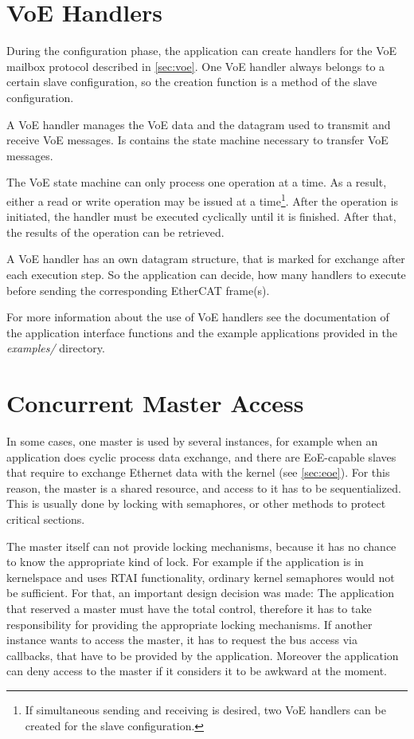 \documentclass[a4paper,12pt,BCOR=6mm,bibtotoc,idxtotoc]{scrbook}
\begin{document}
\section{VoE Handlers}
\label{sec:api-voe}

During the configuration phase, the application can create handlers for the
VoE mailbox protocol described in \autoref{sec:voe}. One VoE handler always
belongs to a certain slave configuration, so the creation function is a method
of the slave configuration.

A VoE handler manages the VoE data and the datagram used to transmit and
receive VoE messages. Is contains the state machine necessary to transfer VoE
messages.

The VoE state machine can only process one operation at a time. As a result,
either a read or write operation may be issued at a time\footnote{If
simultaneous sending and receiving is desired, two VoE handlers can be created
for the slave configuration.}. After the operation is initiated, the handler
must be executed cyclically until it is finished. After that, the results of
the operation can be retrieved.

A VoE handler has an own datagram structure, that is marked for exchange after
each execution step. So the application can decide, how many handlers to
execute before sending the corresponding EtherCAT frame(s).

For more information about the use of VoE handlers see the documentation of
the application interface functions and the example applications provided in
the \textit{examples/} directory.


\section{Concurrent Master Access}
\label{sec:concurr}

In some cases, one master is used by several instances, for example when an
application does cyclic process data exchange, and there are EoE-capable
slaves that require to exchange Ethernet data with the kernel (see
\autoref{sec:eoe}). For this reason, the master is a shared resource, and
access to it has to be sequentialized. This is usually done by locking with
semaphores, or other methods to protect critical sections.

The master itself can not provide locking mechanisms, because it has no chance
to know the appropriate kind of lock. For example if the application is in
kernelspace and uses RTAI functionality, ordinary kernel semaphores would not
be sufficient. For that, an important design decision was made: The
application that reserved a master must have the total control, therefore it
has to take responsibility for providing the appropriate locking mechanisms.
If another instance wants to access the master, it has to request the bus
access via callbacks, that have to be provided by the application. Moreover
the application can deny access to the master if it considers it to be awkward
at the moment.
\end{document}
